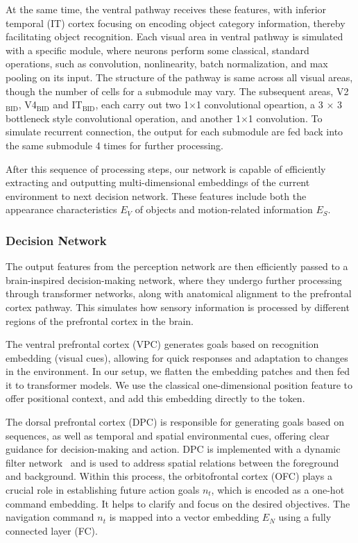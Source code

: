 At the same time, the ventral pathway receives these features, with inferior temporal (IT) cortex focusing on encoding object category information, thereby facilitating object recognition.
Each visual area in ventral pathway is simulated with a specific module, where neurons perform some classical, standard operations, such as convolution, nonlinearity, batch normalization, and max pooling on its input. 
The structure of the pathway is same across all visual areas, though the number of cells for a submodule may vary.
The subsequent areas, V2$_\text{BID}$, V4$_\text{BID}$ and IT$_\text{BID}$, each carry out two 1$\times$1 convolutional opeartion, a 3 $ \times $ 3 bottleneck style convolutional operation, and another 1$\times$1 convolution. 
To simulate recurrent connection, the output for each submodule are fed back into the same submodule 4 times for further processing.


%
After this sequence of processing steps, our network is capable of efficiently extracting and outputting multi-dimensional embeddings of the current environment to next decision network. 
These features include both the appearance characteristics $ E_V $ of objects and motion-related information $ E_S $.



\subsubsection{Decision Network}
The output features from the perception network are then efficiently passed to a brain-inspired decision-making network, where they undergo further processing through transformer networks, along with anatomical alignment to the prefrontal cortex pathway. 
This simulates how sensory information is processed by different regions of the prefrontal cortex in the brain.
%


The ventral prefrontal cortex (VPC) generates goals based on recognition embedding (visual cues), allowing for quick responses and adaptation to changes in the environment\cite{passingham2012neurobiology}.
%
In our setup, we flatten the embedding patches and then fed it to transformer models.
We use the classical one-dimensional position feature to offer positional context, and add this embedding directly to the token.


The dorsal prefrontal cortex (DPC) is responsible for generating goals based on sequences, as well as temporal and spatial environmental cues, offering clear guidance for decision-making and action\cite{passingham2012neurobiology}.
DPC is implemented with a dynamic filter network~\cite{jia2016dynamic} and is used to address spatial relations between the foreground and background.
Within this process, the orbitofrontal cortex (OFC) plays a crucial role in establishing future action goals $n_t$, which is encoded as a one-hot command embedding.
It helps to clarify and focus on the desired objectives. 
The navigation command $n_t$ is mapped into a vector embedding $E_N$ using a fully connected layer (FC).




